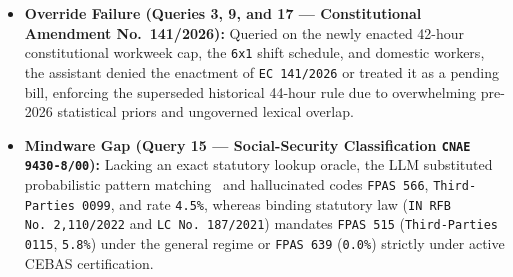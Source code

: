 \documentclass[10pt,twocolumn]{article}
\begin{document}
\begin{itemize}[leftmargin=*,nosep,itemsep=3pt]
    \item \textbf{Override Failure (Queries 3, 9, and 17 --- Constitutional Amendment No.~141/2026):} Queried on the newly enacted 42-hour constitutional workweek cap, the \texttt{6x1} shift schedule, and domestic workers, the assistant denied the enactment of \texttt{EC 141/2026} or treated it as a pending bill, enforcing the superseded historical 44-hour rule due to overwhelming pre-2026 statistical priors and ungoverned lexical overlap.
    \item \textbf{Mindware Gap (Query 15 --- Social-Security Classification \texttt{CNAE 9430-8/00}):} Lacking an exact statutory lookup oracle, the LLM substituted probabilistic pattern matching~\cite{E24} and hallucinated codes \texttt{FPAS 566}, \texttt{Third-Parties 0099}, and rate \texttt{4.5\%}, whereas binding statutory law (\texttt{IN RFB No.~2,110/2022} and \texttt{LC No.~187/2021}) mandates \texttt{FPAS 515} (\texttt{Third-Parties 0115}, \texttt{5.8\%}) under the general regime or \texttt{FPAS 639} (\texttt{0.0\%}) strictly under active CEBAS certification.
\end{itemize}
\end{document}
